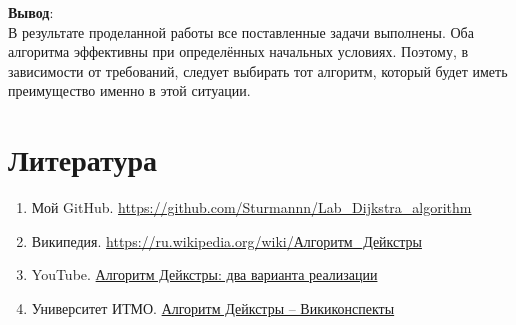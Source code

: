 \begin{text}
\textbf{Вывод}:\\
В результате проделанной работы все поставленные задачи выполнены. Оба алгоритма эффективны при определённых начальных условиях. Поэтому, в зависимости от требований, следует выбирать тот алгоритм, который будет иметь преимущество именно в этой ситуации.
\newpage

\section{Литература}

\begin{enumerate}
	\item Мой GitHub. \url{https://github.com/Sturmannn/Lab_Dijkstra_algorithm}
	\item Википедия. \href{https://ru.wikipedia.org/wiki/%D0%90%D0%BB%D0%B3%D0%BE%D1%80%D0%B8%D1%82%D0%BC_%D0%94%D0%B5%D0%B9%D0%BA%D1%81%D1%82%D1%80%D1%8B}{https://ru.wikipedia.org/wiki/Алгоритм\_Дейкстры}
	\item YouTube. \href{https://www.youtube.com/watch?v=J-7MzbEtTR0&t=2s}{Алгоритм Дейкстры: два варианта реализации}
	\item Университет ИТМО. \href{https://neerc.ifmo.ru/wiki/index.php?title=%D0%90%D0%BB%D0%B3%D0%BE%D1%80%D0%B8%D1%82%D0%BC_%D0%94%D0%B5%D0%B9%D0%BA%D1%81%D1%82%D1%80%D1%8B}{Алгоритм Дейкстры -- Викиконспекты}
\end{enumerate}

\end{text}
